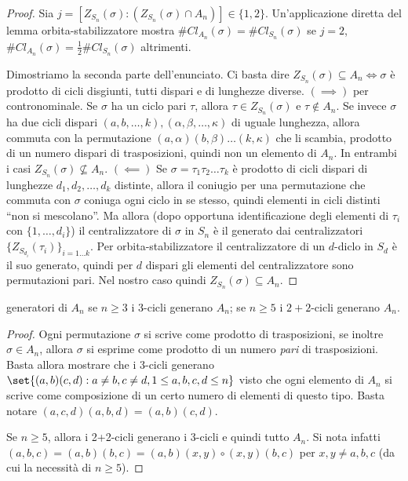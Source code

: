 \begin{proof}
    Sia $j=[Z_{S_n}(\sigma): (Z_{S_n}(\sigma) \cap A_n)] \in \{1, 2\}$. Un'applicazione diretta del lemma orbita-stabilizzatore mostra $\#Cl_{A_n}(\sigma) = \#Cl_{S_n}(\sigma)$ se $j = 2$, $\#Cl_{A_n}(\sigma) = \frac12\#Cl_{S_n}(\sigma)$ altrimenti. 
    
    Dimostriamo la seconda parte dell'enunciato. Ci basta dire $Z_{S_n}(\sigma) \subseteq A_n \iff \sigma$ è prodotto di cicli disgiunti, tutti dispari e di lunghezze diverse. $(\implies)$ per contronominale. Se $\sigma$ ha un ciclo pari $\tau$, allora $\tau \in Z_{S_n}(\sigma)$ e $\tau \notin A_n$. Se invece $\sigma$ ha due cicli dispari $(a, b, \dots, k), (\alpha, \beta, \dots, \kappa)$ di uguale lunghezza, allora commuta con la permutazione $(a, \alpha)(b, \beta) \dots (k, \kappa)$ che li scambia, prodotto di un numero dispari di trasposizioni, quindi non un elemento di $A_n$. In entrambi i casi $Z_{S_n}(\sigma) \not\subseteq A_n$.
    $(\impliedby)$ Se $\sigma = \tau_1 \tau_2 \dots \tau_k$ è prodotto di cicli dispari di lunghezze $d_1, d_2, \dots, d_k$ distinte, allora il coniugio per una permutazione che commuta con $\sigma$ coniuga ogni ciclo in se stesso, quindi elementi in cicli distinti ``non si mescolano''. Ma allora (dopo opportuna identificazione degli elementi di $\tau_i$ con $\{1, \dots, d_i\}$) il centralizzatore di $\sigma$ in $S_n$ è il generato dai centralizzatori $\{ Z_{S_{d_i}}(\tau_i) \}_{i=1\dots k}$. Per orbita-stabilizzatore il centralizzatore di un $d$-diclo in $S_d$ è il suo generato, quindi per $d$ dispari gli elementi del centralizzatore sono permutazioni pari. Nel nostro caso quindi $Z_{S_n}(\sigma) \subseteq A_n$.
\end{proof}
\begin{proposition}{generatori di $A_n$}
    se $n\geq 3$ i $3$-cicli generano $A_n$; se $n\geq 5$ i $2+2$-cicli generano $A_n$.
\end{proposition}
\begin{proof}
    Ogni permutazione $\sigma$ si scrive come prodotto di trasposizioni, se inoltre $\sigma \in A_n$, allora $\sigma$ si esprime come prodotto di un numero \emph{pari} di trasposizioni. Basta allora mostrare che i 3-cicli generano $\set{(a,b)(c,d) : a \neq b, c\neq d, 1\leq a,b,c,d \leq n}$ visto che ogni elemento di $A_n$ si scrive come composizione di un certo numero di elementi di questo tipo. Basta notare $(a, c, d)(a, b, d) = (a,b)(c,d)$.
    
    Se $n \ge 5$, allora i 2+2-cicli generano i 3-cicli e quindi tutto $A_n$. Si nota infatti $(a, b, c) = (a, b)(b, c) = (a, b)(x, y) \circ (x, y)(b, c)$ per $x, y \neq a, b, c$ (da cui la necessità di $n \ge 5$).
\end{proof}
